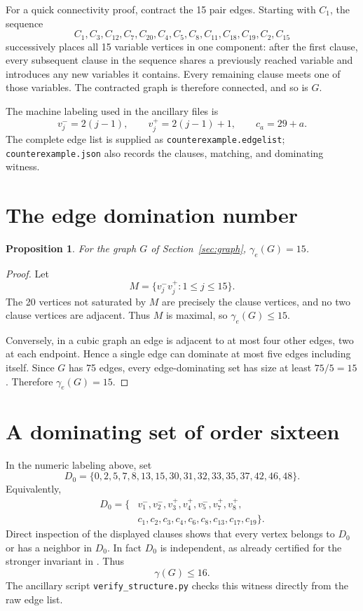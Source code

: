 \documentclass[11pt]{article}
\newtheorem{proposition}[theorem]{Proposition}
\theoremstyle{definition}
\theoremstyle{remark}
\begin{document}
For a quick connectivity proof, contract the 15 pair edges.  Starting with \(C_1\), the sequence
\[
C_1,C_3,C_{12},C_7,C_{20},C_4,C_5,C_8,C_{11},C_{18},C_{19},C_2,C_{15}
\]
successively places all 15 variable vertices in one component: after the first clause, every subsequent clause in the sequence shares a previously reached variable and introduces any new variables it contains.  Every remaining clause meets one of those variables.  The contracted graph is therefore connected, and so is \(G\).

The machine labeling used in the ancillary files is
\[
v_j^-=2(j-1),\qquad v_j^+=2(j-1)+1,\qquad c_a=29+a.
\]
The complete edge list is supplied as \texttt{counterexample.edgelist}; \texttt{counterexample.json} also records the clauses, matching, and dominating witness.

\section{The edge domination number}\label{sec:edge}
\begin{proposition}\label{prop:edge}
For the graph \(G\) of Section~\ref{sec:graph}, \(\gamma_e(G)=15\).
\end{proposition}

\begin{proof}
Let
\[
M=\{v_j^-v_j^+:1\leq j\leq15\}.
\]
The 20 vertices not saturated by \(M\) are precisely the clause vertices, and no two clause vertices are adjacent.  Thus \(M\) is maximal, so \(\gamma_e(G)\leq15\).

Conversely, in a cubic graph an edge is adjacent to at most four other edges, two at each endpoint.  Hence a single edge can dominate at most five edges including itself.  Since \(G\) has 75 edges, every edge-dominating set has size at least \(75/5=15\).  Therefore \(\gamma_e(G)=15\).
\end{proof}

\section{A dominating set of order sixteen}\label{sec:upper}
In the numeric labeling above, set
\[
D_0=\{0,2,5,7,8,13,15,30,31,32,33,35,37,42,46,48\}.
\]
Equivalently,
\[
\begin{split}
D_0=\{&v_1^-,v_2^-,v_3^+,v_4^+,v_5^-,v_7^+,v_8^+,\\
&c_1,c_2,c_3,c_4,c_6,c_8,c_{13},c_{17},c_{19}\}.
\end{split}
\]
Direct inspection of the displayed clauses shows that every vertex belongs to \(D_0\) or has a neighbor in \(D_0\).  In fact \(D_0\) is independent, as already certified for the stronger invariant in \cite{TxGraffiti2026}.  Thus
\[
\gamma(G)\leq16.
\]
The ancillary script \texttt{verify\_structure.py} checks this witness directly from the raw edge list.
\end{document}
